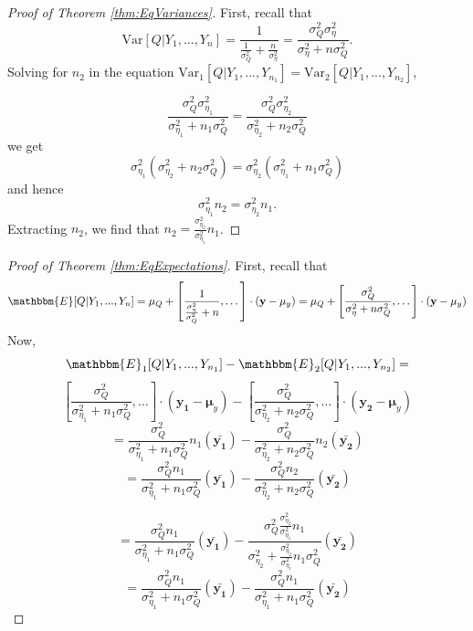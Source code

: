 \begin{proof}[Proof of Theorem \ref{thm:EqVariances}]
First, recall that
\[
\text{Var}[Q|Y_1,...,Y_n] =
\frac{1}{\frac{1}{\sigma_Q^2} + \frac{n}{\sigma_\eta^2}}=
\frac{\sigma_Q^2\sigma_\eta^2}{\sigma_\eta^2+n\sigma_Q^2}.
\]
Solving for $n_2$ in the equation $\text{Var}_1[Q|Y_1,...,Y_{n_1}] =\text{Var}_2[Q|Y_1,...,Y_{n_2}]$,

\[
\frac{\sigma_Q^2\sigma_{\eta_1}^2}{\sigma_{\eta_1}^2+n_1\sigma_Q^2}=
\frac{\sigma_Q^2\sigma_{\eta_2}^2}{\sigma_{\eta_2}^2+n_2\sigma_Q^2}
\]
we get
\[
\sigma_{\eta_1}^2(\sigma_{\eta_2}^2+n_2\sigma_Q^2)=
\sigma_{\eta_2}^2(\sigma_{\eta_1}^2+n_1\sigma_Q^2)
\]
and hence
\[
\sigma_{\eta_1}^2n_2=
\sigma_{\eta_2}^2n_1.
\]
Extracting $n_2$, we find that $n_2=\frac{\sigma_{\eta_2}^2}{\sigma_{\eta_1}^2}n_1$.
\end{proof}


\begin{proof}[Proof of Theorem \ref{thm:EqExpectations}]
First, recall that
\[
\mathbbm{E}[Q|Y_1,...,Y_n]
= \mu_Q + \left[\frac{1}{\frac{\sigma_\eta^2}{\sigma_Q^2} + n}, \dots \right] \cdot (\mathbf{y} - \mathbf{\mu}_y)=\mu_Q + \left[\frac{\sigma_Q^2}{\sigma_\eta^2 + n\sigma_Q^2}, \dots \right] \cdot (\mathbf{y} - \mathbf{\mu}_y)
\]
Now,
\[
\mathbbm{E}_1[Q|Y_1,...,Y_{n_1}]-\mathbbm{E}_2[Q|Y_1,...,Y_{n_2}]=
\]
\[
 \left[\frac{\sigma_Q^2}{\sigma_{\eta_1}^2 + n_1\sigma_Q^2}, \dots \right] \cdot (\mathbf{y_1} - \mathbf{\mu}_y)-
 \left[\frac{\sigma_Q^2}{\sigma_{\eta_2}^2 + n_2\sigma_Q^2}, \dots \right] \cdot (\mathbf{y_2} - \mathbf{\mu}_y)
\]
\[
=\frac{\sigma_Q^2}{\sigma_{\eta_1}^2 + n_1\sigma_Q^2}n_1(\mathbf{\bar{y_1}})-
\frac{\sigma_Q^2}{\sigma_{\eta_2}^2 +n_2\sigma_Q^2}n_2(\mathbf{\bar{y_2}})
\]
\[
=\frac{\sigma_Q^2n_1}{\sigma_{\eta_1}^2 + n_1\sigma_Q^2}(\mathbf{\bar{y_1}})-
\frac{\sigma_Q^2n_2}{\sigma_{\eta_2}^2 +n_2\sigma_Q^2}(\mathbf{\bar{y_2}})
\]

\[
=\frac{\sigma_Q^2n_1}{\sigma_{\eta_1}^2 + n_1\sigma_Q^2}(\mathbf{\bar{y_1}})-
\frac{\sigma_Q^2\frac{\sigma_{\eta_2}^2}{\sigma_{\eta_1}^2}n_1}{\sigma_{\eta_2}^2 +\frac{\sigma_{\eta_2}^2}{\sigma_{\eta_1}^2}n_1\sigma_Q^2}(\mathbf{\bar{y_2}})
\]
\[
=\frac{\sigma_Q^2n_1}{\sigma_{\eta_1}^2 + n_1\sigma_Q^2}(\mathbf{\bar{y_1}})-
\frac{\sigma_Q^2n_1}{\sigma_{\eta_1}^2 +n_1\sigma_Q^2}(\mathbf{\bar{y_2}})
\]
\end{proof}